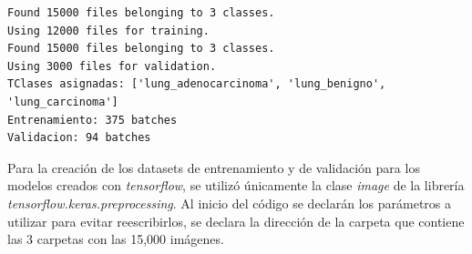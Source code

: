 \begin{lstlisting}[caption=Salida del código]
Found 15000 files belonging to 3 classes.
Using 12000 files for training.
Found 15000 files belonging to 3 classes.
Using 3000 files for validation.
TClases asignadas: ['lung_adenocarcinoma', 'lung_benigno', 'lung_carcinoma']
Entrenamiento: 375 batches
Validacion: 94 batches
\end{lstlisting}

Para la creación de los datasets de entrenamiento y de validación para los modelos creados con \textit{tensorflow}, se utilizó únicamente la clase \textit{image} de la librería \textit{tensorflow.keras.preprocessing}. Al inicio del código se declarán los parámetros a utilizar para evitar reescribirlos, se declara la dirección de la carpeta que contiene las 3 carpetas con las 15,000 imágenes. 


